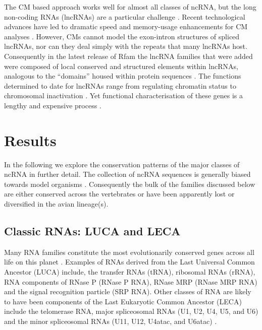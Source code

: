 \documentclass[10pt]{bmc_article}
\newenvironment{bmcformat}{\begin{raggedright}\baselineskip20pt\sloppy\setboolean{publ}{false}}{\end{raggedright}\baselineskip20pt\sloppy}
\begin{document}
\begin{bmcformat}
The CM based approach works well for almost all classes of ncRNA, but
the long non-coding RNAs (lncRNAs) are a particular challenge
\cite{Guttman:2009}. Recent technological advances have led to dramatic
speed and memory-usage enhancements for CM analyses
\cite{Eddy:2002,Nawrocki:2007,Nawrocki:2009,Eddy:2011}. However, CMs
cannot model the exon-intron structures of spliced lncRNAs, nor can they
deal simply with the repeats that many lncRNAs host. Consequently in
the latest release of Rfam the lncRNA families that were added were
composed of local conserved and structured elements within lncRNAs,
analogous to the ``domains'' housed within protein sequences
\cite{Burge:2013}. The functions determined to date for lncRNAs
range from regulating chromatin status to chromosomal inactivation
\cite{Rinn:2007,Chow:2005}. Yet functional characterisation of these
genes is a lengthy and expensive process \cite{Guttman:2009}.


\section*{Results}
In the following we explore the conservation patterns of the major
classes of ncRNA in further detail. The collection of ncRNA sequences
is generally biased towards model organisms
\cite{Gardner:2010,Hoeppner:2012}. Consequently the bulk of the
families discussed below are either conserved across the vertebrates
or have been apparently lost or diversified in the avian
lineage(s).

\subsection*{Classic RNAs: LUCA and LECA}

Many RNA families constitute the most evolutionarily conserved genes
across all life on this planet \cite{Jeffares:1998}. Examples of RNAs
derived from the Last Universal Common Ancestor (LUCA) include, the
transfer RNAs (tRNA), ribosomal RNAs (rRNA), RNA components of RNase P
(RNase P RNA), RNase MRP (RNase MRP RNA) and the signal recognition
particle (SRP RNA). Other classes of RNA are likely to have been
components of the Last Eukaryotic Common Ancestor (LECA) include the
telomerase RNA, major spliceosomal RNAs (U1, U2, U4, U5, and U6) and
the minor spliceosomal RNAs (U11, U12, U4atac, and U6atac)
\cite{Hoeppner:2012}.



\end{bmcformat}
\end{document}
